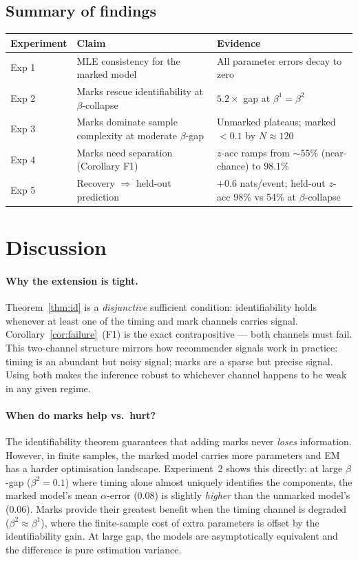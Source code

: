 \documentclass[11pt]{article}
\theoremstyle{remark}
\begin{document}
\subsection{Summary of findings}
\begin{center}
\begin{tabular}{@{}lll@{}}
\toprule
Experiment & Claim & Evidence \\
\midrule
Exp 1 & MLE consistency for the marked model & All parameter errors decay to zero \\
Exp 2 & Marks rescue identifiability at $\beta$-collapse & $5.2\times$ gap at $\beta^1 = \beta^2$ \\
Exp 3 & Marks dominate sample complexity at moderate $\beta$-gap & Unmarked plateaus; marked $<0.1$ by $N\approx 120$ \\
Exp 4 & Marks need separation (Corollary F1) & $z$-acc ramps from $\sim 55\%$ (near-chance) to $98.1\%$ \\
Exp 5 & Recovery $\Rightarrow$ held-out prediction & $+0.6$ nats/event; held-out $z$-acc 98\% vs 54\% at $\beta$-collapse \\
\bottomrule
\end{tabular}
\end{center}

\section{Discussion}
\label{sec:discussion}

\paragraph{Why the extension is tight.}
Theorem~\ref{thm:id} is a \emph{disjunctive} sufficient condition: identifiability holds whenever at least one of the timing and mark channels carries signal. Corollary~\ref{cor:failure}~(F1) is the exact contrapositive --- both channels must fail. This two-channel structure mirrors how recommender signals work in practice: timing is an abundant but noisy signal; marks are a sparse but precise signal. Using both makes the inference robust to whichever channel happens to be weak in any given regime.

\paragraph{When do marks help vs.\ hurt?}
The identifiability theorem guarantees that adding marks never \emph{loses} information. However, in finite samples, the marked model carries more parameters and EM has a harder optimisation landscape. Experiment~2 shows this directly: at large $\beta$-gap ($\beta^2 = 0.1$) where timing alone almost uniquely identifies the components, the marked model's mean $\alpha$-error ($0.08$) is slightly \emph{higher} than the unmarked model's ($0.06$). Marks provide their greatest benefit when the timing channel is degraded ($\beta^2 \approx \beta^1$), where the finite-sample cost of extra parameters is offset by the identifiability gain. At large gap, the models are asymptotically equivalent and the difference is pure estimation variance.
\end{document}
